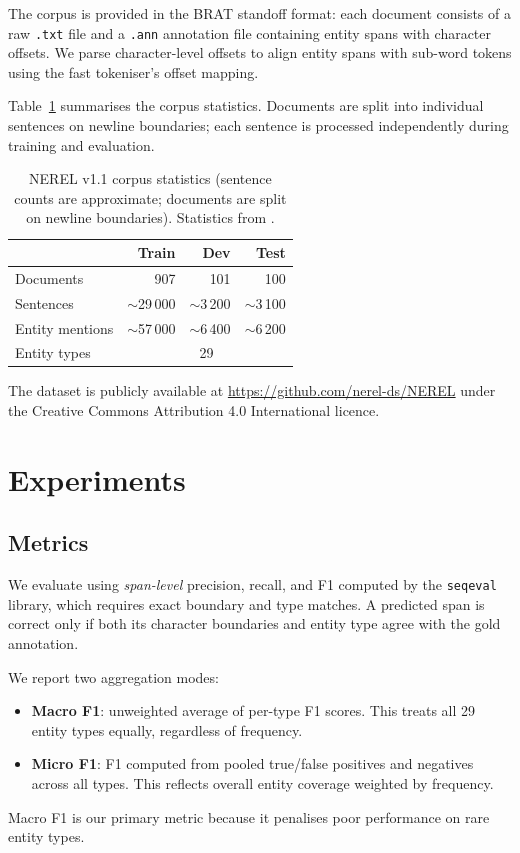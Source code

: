 \documentclass{article}
\begin{document}
The corpus is provided in the BRAT standoff format: each document consists of
a raw \texttt{.txt} file and a \texttt{.ann} annotation file containing entity
spans with character offsets.
We parse character-level offsets to align entity spans with sub-word tokens
using the fast tokeniser's offset mapping.

Table~\ref{tab:data} summarises the corpus statistics.
Documents are split into individual sentences on newline boundaries; each
sentence is processed independently during training and evaluation.

\begin{table}[tbh!]
\begin{center}
\begin{tabular}[t]{|l|rrr|}
\hline
 & Train & Dev & Test \\
\hline
Documents      & 907   & 101  & 100  \\
Sentences      & $\sim$29\,000 & $\sim$3\,200 & $\sim$3\,100 \\
Entity mentions & $\sim$57\,000 & $\sim$6\,400 & $\sim$6\,200 \\
Entity types   & \multicolumn{3}{c|}{29} \\
\hline
\end{tabular}
\caption{NEREL v1.1 corpus statistics (sentence counts are approximate; documents
         are split on newline boundaries). Statistics from \citet{loukachevitch2021nerel}.}
\label{tab:data}
\end{center}
\end{table}

The dataset is publicly available at
\href{https://github.com/nerel-ds/NEREL}{https://github.com/nerel-ds/NEREL}
under the Creative Commons Attribution 4.0 International licence.

\section{Experiments}

\subsection{Metrics}

We evaluate using \emph{span-level} precision, recall, and F1 computed by the
\texttt{seqeval} library, which requires exact boundary and type matches.
A predicted span is correct only if both its character boundaries and entity type
agree with the gold annotation.

We report two aggregation modes:
\begin{itemize}
  \item \textbf{Macro F1}: unweighted average of per-type F1 scores.
        This treats all 29 entity types equally, regardless of frequency.
  \item \textbf{Micro F1}: F1 computed from pooled true/false positives and
        negatives across all types.
        This reflects overall entity coverage weighted by frequency.
\end{itemize}
Macro F1 is our primary metric because it penalises poor performance on
rare entity types.
\end{document}
